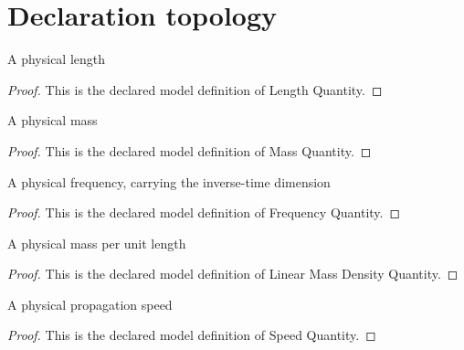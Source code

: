\section{Declaration topology}
\begin{definition}
  \label{def:physics:phyx-mini-0204:phyxminiproblems-problemphyxmini0204-lengthquantity}
  A physical length
\end{definition}
\begin{proof}
  This is the declared model definition of Length Quantity.
\end{proof}
\begin{definition}
  \label{def:physics:phyx-mini-0204:phyxminiproblems-problemphyxmini0204-massquantity}
  A physical mass
\end{definition}
\begin{proof}
  This is the declared model definition of Mass Quantity.
\end{proof}
\begin{definition}
  \label{def:physics:phyx-mini-0204:phyxminiproblems-problemphyxmini0204-frequencyquantity}
  A physical frequency, carrying the inverse-time dimension
\end{definition}
\begin{proof}
  This is the declared model definition of Frequency Quantity.
\end{proof}
\begin{definition}
  \label{def:physics:phyx-mini-0204:phyxminiproblems-problemphyxmini0204-linearmassdensityquantity}
  A physical mass per unit length
\end{definition}
\begin{proof}
  This is the declared model definition of Linear Mass Density Quantity.
\end{proof}
\begin{definition}
  \label{def:physics:phyx-mini-0204:phyxminiproblems-problemphyxmini0204-speedquantity}
  A physical propagation speed
\end{definition}
\begin{proof}
  This is the declared model definition of Speed Quantity.
\end{proof}
